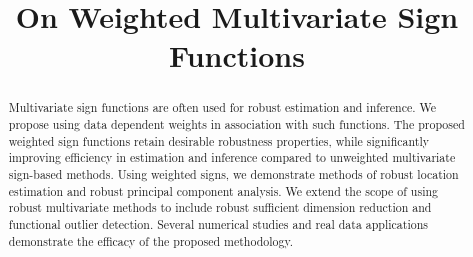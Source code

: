 \documentclass[ejs]{imsart}
\theoremstyle{definition} \newtheorem{Definition}[Theorem]{Definition}
\begin{document}
\begin{frontmatter}
\title{On Weighted Multivariate Sign Functions}


\begin{abstract}
Multivariate sign functions are often used for robust estimation and inference. We propose using data dependent weights in association with such functions. The proposed weighted sign functions  retain desirable robustness properties, while significantly improving efficiency in estimation and 
inference compared to unweighted multivariate sign-based methods. Using weighted signs, we demonstrate methods of robust location estimation and robust principal component analysis. We extend the scope of using robust multivariate methods to include robust sufficient dimension reduction and functional outlier detection. Several numerical studies and real data applications demonstrate the efficacy of the proposed methodology.
\end{abstract}

\begin{keyword}[class=MSC]
\end{keyword}

\begin{keyword}
\end{keyword}
\tableofcontents
\end{frontmatter}
\end{document}
